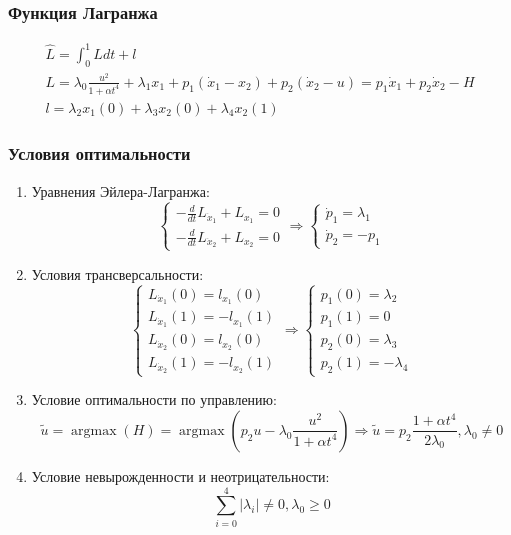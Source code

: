 \documentclass[a4paper,12pt]{article}
\DeclareMathOperator*{\argmax}{argmax}
\begin{document}
\subsubsection*{Функция Лагранжа}

\begin{gather*}
  \hat{L}=\int_0^1L dt+l\\
  L=\lambda_0 \frac{u^2}{1+\alpha t^4} + \lambda_1 x_1+p_1\left(\dot{x}_1-x_2\right)+p_2\left(\dot{x}_2-u\right)=p_1 \dot{x}_1+p_2 \dot{x}_2 - H\\
  l=\lambda_2 x_1(0)+\lambda_3 x_2(0)+\lambda_4 x_2(1)
\end{gather*}

\subsubsection*{Условия оптимальности}

\begin{enumerate}
\def\labelenumi{\arabic{enumi}.}
\item
  Уравнения
  Эйлера-Лагранжа:
  \begin{equation*}
    \begin{cases}
      -\frac{d}{dt}L_{\dot{x}_1}+L_{x_1}=0\\
      -\frac{d}{dt}L_{\dot{x}_2}+L_{x_2}=0
    \end{cases} \Rightarrow \begin{cases}
      \dot{p}_1=\lambda_1\\
      \dot{p}_2=-p_1
    \end{cases}
  \end{equation*}
\item
  Условия трансверсальности:
  \begin{equation*}
    \begin{cases}
      L_{\dot{x}_1}(0)=l_{x_1}(0)\\
      L_{\dot{x}_1}(1)=-l_{x_1}(1)\\
      L_{\dot{x}_2}(0)=l_{x_2}(0)\\
      L_{\dot{x}_2}(1)=-l_{x_2}(1)
    \end{cases} \Rightarrow \begin{cases}
      p_1(0)=\lambda_2\\
      p_1(1)=0\\
      p_2(0)=\lambda_3\\
      p_2(1)=-\lambda_4
    \end{cases}
  \end{equation*}
\item
  Условие оптимальности по управлению:
  \begin{equation*}
    \tilde{u}=\argmax(H)=\argmax\left(p_2u-\lambda_0 \frac{u^2}{1+\alpha t^4}\right)
    \Rightarrow
    \tilde{u}=p_2\frac{1+\alpha t^4}{2\lambda_0}, \lambda_0 \neq0
  \end{equation*}
\item
  Условие невырожденности и неотрицательности:
  \begin{equation*}
    \sum_{i=0}^{4} |\lambda_i| \neq 0, \lambda_0 \ge 0
  \end{equation*}
\end{enumerate}
\end{document}
